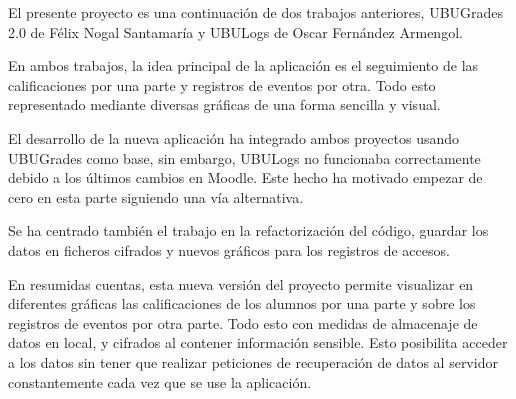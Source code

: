 
El presente proyecto es una continuación de dos trabajos anteriores, UBUGrades 2.0 \cite{nogal_santamaria_continuacion_2017} de Félix Nogal Santamaría y UBULogs \cite{fernandez_armengol_aplicacion_2017} de Oscar Fernández Armengol. 

En ambos trabajos, la idea principal de la aplicación es el seguimiento de las calificaciones por una parte y registros de eventos por otra. Todo esto representado mediante diversas gráficas de una forma sencilla y visual.

El desarrollo de la nueva aplicación ha integrado ambos proyectos usando UBUGrades como base, sin embargo, UBULogs no funcionaba correctamente debido a los últimos cambios en Moodle. Este hecho ha motivado empezar de cero en esta parte siguiendo una vía alternativa.

Se ha centrado también el trabajo en la refactorización del código, guardar los datos en ficheros cifrados y nuevos gráficos para los registros de accesos.

En resumidas cuentas, esta nueva versión del proyecto permite visualizar en diferentes gráficas las calificaciones de los alumnos por una parte y sobre los registros de eventos por otra parte. Todo esto con medidas de almacenaje de datos en local, y cifrados al contener información sensible. Esto posibilita acceder a los datos sin tener que realizar peticiones de recuperación de datos al servidor constantemente cada vez que se use la aplicación.